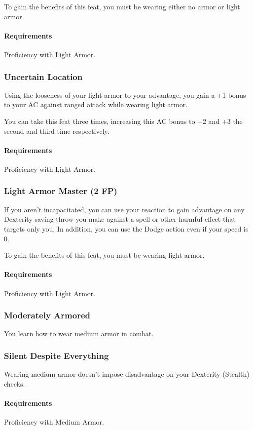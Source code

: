     To gain the benefits of this feat, you must be wearing either no armor or light armor.
    \paragraph{Requirements} Proficiency with Light Armor.
\subsubsection{Uncertain Location} \label{feat::uncertainlocation}
    Using the looseness of your light armor to your advantage, you gain a +1 bonus to your AC against ranged attack while wearing light armor.

    You can take this feat three times, increasing this AC bonus to +2 and +3 the second and third time respectively.
    \paragraph{Requirements} Proficiency with Light Armor.
\subsubsection{Light Armor Master (2 FP)} \label{feat::lightarmormaster}
    If you aren't incapacitated, you can use your reaction to gain advantage on any Dexterity saving throw you make against a spell or other harmful effect that targets only you.
    In addition, you can use the Dodge action even if your speed is 0.

    To gain the benefits of this feat, you must be wearing light armor.
    \paragraph{Requirements} Proficiency with Light Armor.
\subsubsection{Moderately Armored} \label{feat::moderatelyarmored}
    You learn how to wear medium armor in combat.
\subsubsection{Silent Despite Everything} \label{feat::silentdespiteeverything}
    Wearing medium armor doesn't impose disadvantage on your Dexterity (Stealth) checks.
    \paragraph{Requirements} Proficiency with Medium Armor.
